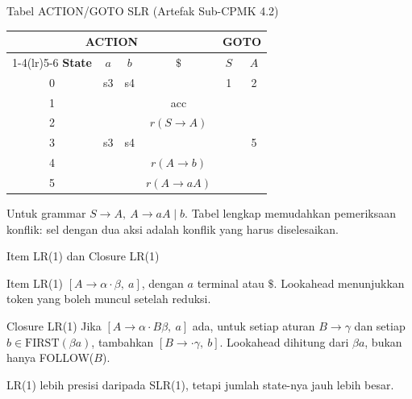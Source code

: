 \documentclass[aspectratio=169,10pt,t]{beamer}
\begin{document}
\begin{frame}{Tabel ACTION/GOTO SLR (Artefak Sub-CPMK 4.2)}
  \small
  \setlength{\tabcolsep}{5pt}
  \begin{tabular}{@{}c|cc c|c c@{}}
    \toprule
    \multicolumn{4}{c|}{\textbf{ACTION}} &
      \multicolumn{2}{c}{\textbf{GOTO}} \\
    \cmidrule(lr){1-4}\cmidrule(lr){5-6}
    \textbf{State} & \(a\) & \(b\) & \(\$\) & \(S\) & \(A\) \\
    \midrule
    0 & s3 & s4 & & 1 & 2 \\
    1 & & & acc & & \\
    2 & & & \(r(S \to A)\) & & \\
    3 & s3 & s4 & & & 5 \\
    4 & & & \(r(A \to b)\) & & \\
    5 & & & \(r(A \to aA)\) & & \\
    \bottomrule
  \end{tabular}

  \vspace{4pt}
  {\footnotesize\color{ubbblue!80}Untuk grammar
  \(S \to A,\ A \to aA \mid b\). Tabel lengkap memudahkan pemeriksaan
  konflik: sel dengan dua aksi adalah konflik yang harus
  diselesaikan.}
\end{frame}

\begin{frame}{Item LR(1) dan Closure LR(1)}
  \begin{block}{Item LR(1)}
    \small
    \([A \to \alpha \cdot \beta,\ a]\), dengan \(a\) terminal atau
    \(\$\). Lookahead menunjukkan token yang boleh muncul setelah
    reduksi.
  \end{block}

  \begin{block}{Closure LR(1)}
    \footnotesize
    Jika \([A \to \alpha \cdot B\beta,\ a]\) ada, untuk setiap aturan
    \(B \to \gamma\) dan setiap
    \(b \in \text{FIRST}(\beta a)\), tambahkan
    \([B \to \cdot \gamma,\ b]\). Lookahead dihitung dari
    \(\beta a\), bukan hanya FOLLOW(\(B\)).
  \end{block}

  \vspace{2pt}
  {\footnotesize LR(1) lebih presisi daripada SLR(1), tetapi jumlah
  state-nya jauh lebih besar.}
\end{frame}
\end{document}
